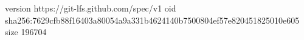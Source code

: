 version https://git-lfs.github.com/spec/v1
oid sha256:7629cfb88f16403a80054a9a331b4624140b7500804ef57e820451825010e605
size 196704
